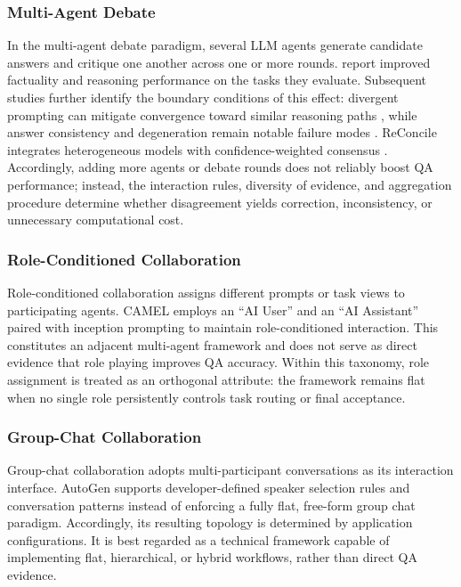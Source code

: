\subsubsection{Multi-Agent Debate}
\label{sec:debate}

In the multi-agent debate paradigm, several LLM agents generate candidate answers and critique one another across one or more rounds. \citet{du2024multiagent_debate} report improved factuality and reasoning performance on the tasks they evaluate. Subsequent studies further identify the boundary conditions of this effect: divergent prompting can mitigate convergence toward similar reasoning paths \citep{liang2024divergent_debate}, while answer consistency and degeneration remain notable failure modes \citep{xiong2023inter_consistency}. ReConcile integrates heterogeneous models with confidence-weighted consensus \citep{chen2024reconcile}. Accordingly, adding more agents or debate rounds does not reliably boost QA performance; instead, the interaction rules, diversity of evidence, and aggregation procedure determine whether disagreement yields correction, inconsistency, or unnecessary computational cost.

\subsubsection{Role-Conditioned Collaboration}
\label{sec:roleplay}

Role-conditioned collaboration assigns different prompts or task views to participating agents. CAMEL \citep{li2023camel} employs an “AI User” and an “AI Assistant” paired with inception prompting to maintain role-conditioned interaction. This constitutes an adjacent multi-agent framework and does not serve as direct evidence that role playing improves QA accuracy. Within this taxonomy, role assignment is treated as an orthogonal attribute: the framework remains flat when no single role persistently controls task routing or final acceptance.

\subsubsection{Group-Chat Collaboration}
\label{sec:groupchat}

Group-chat collaboration adopts multi-participant conversations as its interaction interface. AutoGen \citep{wu2024autogen} supports developer-defined speaker selection rules and conversation patterns instead of enforcing a fully flat, free-form group chat paradigm. Accordingly, its resulting topology is determined by application configurations. It is best regarded as a technical framework capable of implementing flat, hierarchical, or hybrid workflows, rather than direct QA evidence.

